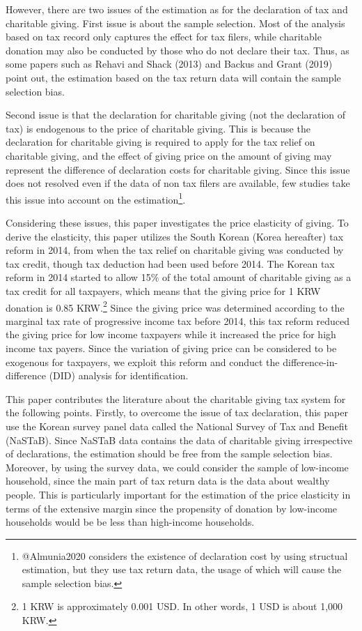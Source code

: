 \documentclass[
  11pt,
  a4paper,
]{article}
\begin{document}
However, there are two issues of the estimation as for the declaration of tax and charitable giving.
First issue is about the sample selection. Most of the analysis based on tax record only captures the effect for tax filers, while charitable donation may also be conducted by those who do not declare their tax. Thus, as some papers such as Rehavi and Shack (2013) and Backus and Grant (2019) point out, the estimation based on the tax return data will contain the sample selection bias.

Second issue is that the declaration for charitable giving (not the declaration of tax) is endogenous to the price of charitable giving. This is because the declaration for charitable giving is required to apply for the tax relief on charitable giving, and the effect of giving price on the amount of giving may represent the difference of declaration costs for charitable giving. Since this issue does not resolved even if the data of non tax filers are available, few studies take this issue into account on the estimation\footnote{@Almunia2020 considers the existence of declaration cost by using structual estimation, but they use tax return data, the usage of which will cause the sample selection bias.}.

Considering these issues, this paper investigates the price elasticity of giving. To derive the elasticity, this paper utilizes the South Korean (Korea hereafter) tax reform in 2014, from when the tax relief on charitable giving was conducted by tax credit, though tax deduction had been used before 2014.
The Korean tax reform in 2014 started to allow 15\% of the total amount of charitable giving as a tax credit for all taxpayers, which means that the giving price for 1 KRW donation is 0.85 KRW.\footnote{1 KRW is approximately 0.001 USD. In other words, 1 USD is about 1,000 KRW.} Since the giving price was determined according to the marginal tax rate of progressive income tax before 2014, this tax reform reduced the giving price for low income taxpayers while it increased the price for high income tax payers. Since the variation of giving price can be considered to be exogenous for taxpayers, we exploit this reform and conduct the difference-in-difference (DID) analysis for identification.

This paper contributes the literature about the charitable giving tax system for the following points. Firstly, to overcome the issue of tax declaration, this paper use the Korean survey panel data called the National Survey of Tax and Benefit (NaSTaB). Since NaSTaB data contains the data of charitable giving irrespective of declarations, the estimation should be free from the sample selection bias. Moreover, by using the survey data, we could consider the sample of low-income household, since the main part of tax return data is the data about wealthy people. This is particularly important for the estimation of the price elasticity in terms of the extensive margin since the propensity of donation by low-income households would be be less than high-income households.
\end{document}
